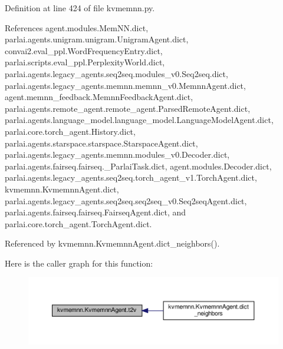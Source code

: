 Definition at line 424 of file kvmemnn.\+py.



References agent.\+modules.\+Mem\+N\+N.\+dict, parlai.\+agents.\+unigram.\+unigram.\+Unigram\+Agent.\+dict, convai2.\+eval\+\_\+ppl.\+Word\+Frequency\+Entry.\+dict, parlai.\+scripts.\+eval\+\_\+ppl.\+Perplexity\+World.\+dict, parlai.\+agents.\+legacy\+\_\+agents.\+seq2seq.\+modules\+\_\+v0.\+Seq2seq.\+dict, parlai.\+agents.\+legacy\+\_\+agents.\+memnn.\+memnn\+\_\+v0.\+Memnn\+Agent.\+dict, agent.\+memnn\+\_\+feedback.\+Memnn\+Feedback\+Agent.\+dict, parlai.\+agents.\+remote\+\_\+agent.\+remote\+\_\+agent.\+Parsed\+Remote\+Agent.\+dict, parlai.\+agents.\+language\+\_\+model.\+language\+\_\+model.\+Language\+Model\+Agent.\+dict, parlai.\+core.\+torch\+\_\+agent.\+History.\+dict, parlai.\+agents.\+starspace.\+starspace.\+Starspace\+Agent.\+dict, parlai.\+agents.\+legacy\+\_\+agents.\+memnn.\+modules\+\_\+v0.\+Decoder.\+dict, parlai.\+agents.\+fairseq.\+fairseq.\+\_\+\+Parlai\+Task.\+dict, agent.\+modules.\+Decoder.\+dict, parlai.\+agents.\+legacy\+\_\+agents.\+seq2seq.\+torch\+\_\+agent\+\_\+v1.\+Torch\+Agent.\+dict, kvmemnn.\+Kvmemnn\+Agent.\+dict, parlai.\+agents.\+legacy\+\_\+agents.\+seq2seq.\+seq2seq\+\_\+v0.\+Seq2seq\+Agent.\+dict, parlai.\+agents.\+fairseq.\+fairseq.\+Fairseq\+Agent.\+dict, and parlai.\+core.\+torch\+\_\+agent.\+Torch\+Agent.\+dict.



Referenced by kvmemnn.\+Kvmemnn\+Agent.\+dict\+\_\+neighbors().

Here is the caller graph for this function\+:
\nopagebreak
\begin{figure}[H]
\begin{center}
\leavevmode
\includegraphics[width=350pt]{classkvmemnn_1_1KvmemnnAgent_adf2131a64c05d6d6538b431be1ea8531_icgraph}
\end{center}
\end{figure}
\mbox{\label{classkvmemnn_1_1KvmemnnAgent_afaf2052da2fa6c4eb1278dd0bd78f2cf}} 

